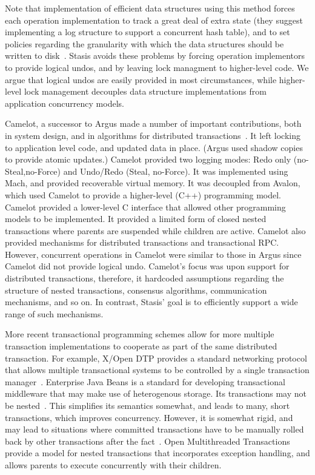 \documentclass[letterpaper,twocolumn,10pt]{article}
\newcommand{\yad}{Stasis\xspace}
\newcommand{\yads}{Stasis'\xspace}
\begin{document}
Note that implementation of efficient data structures using this
method forces each operation implementation to track a great deal of
extra state (they suggest implementing a log structure to support a
concurrent hash table), and to set policies regarding the granularity
with which the data structures should be written to
disk~\cite{argusImplementation}.  \yad avoids these problems by
forcing operation implementors to provide logical undos, and by
leaving lock managment to higher-level code.  We argue that logical
undos are easily provided in most circumstances, while higher-level
lock management decouples data structure implementations from
application concurrency models.


Camelot, a successor to Argus made a number of important
contributions, both in system design, and in algorithms for
distributed transactions~\cite{camelot}.  It left locking to application level code,
and updated data in place.  (Argus used shadow copies to provide
atomic updates.)  Camelot provided two logging modes: Redo only
(no-Steal,no-Force) and Undo/Redo (Steal, no-Force).  It was
implemented using Mach, and provided recoverable virtual memory.  It
was decoupled from Avalon, which used Camelot to provide a
higher-level (C++) programming model.  Camelot provided a lower-level
C interface that allowed other programming models to be
implemented.  It provided a limited form of closed nested transactions
where parents are suspended while children are active.  Camelot also
provided mechanisms for distributed transactions and transactional
RPC.  However, concurrent operations in Camelot were similar to those
in Argus since Camelot did not provide logical undo.  Camelot's focus
was upon support for distributed transactions, therefore, it hardcoded
assumptions regarding the structure of nested transactions, consensus
algorithms, communication mechanisms, and so on.  In contrast, \yads
goal is to efficiently support a wide range of such mechanisms.

More recent transactional programming schemes allow for more multiple
transaction implementations to cooperate as part of the same
distributed transaction.  For example, X/Open DTP provides a standard
networking protocol that allows multiple transactional systems to be
controlled by a single transaction manager~\cite{something}.
Enterprise Java Beans is a standard for developing transactional
middleware that may make use of heterogenous storage.  Its
transactions may not be nested~\cite{something}.  This simplifies its
semantics somewhat, and leads to many, short transactions, which
improves concurrency.  However, it is somewhat rigid, and may lead to
situations where committed transactions have to be manually rolled
back by other transactions after the fact~\cite{ejbCritique}.  Open
Multithreaded Transactions provide a model for nested transactions
that incorporates exception handling, and allows parents to execute
concurrently with their children.
\end{document}
